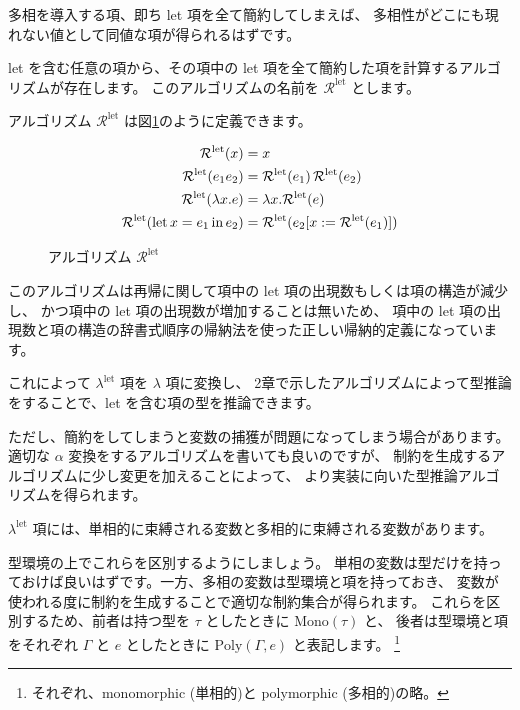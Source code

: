多相を導入する項、即ち let 項を全て簡約してしまえば、
多相性がどこにも現れない値として同値な項が得られるはずです。

let を含む任意の項から、その項中の let 項を全て簡約した項を計算するアルゴリズムが存在します。
このアルゴリズムの名前を $\mathcal R^\mathrm{let}$ とします。

アルゴリズム $\mathcal R^\mathrm{let}$ は図\ref{fig:algorithm-rlet}のように定義できます。

\begin{figure}[htbp]
  \begin{align*}
    \mathcal R^\mathrm{let}(x) &= x \\
    \mathcal R^\mathrm{let}(e_1 e_2) &=
      \mathcal R^\mathrm{let}(e_1) \, \mathcal R^\mathrm{let}(e_2) \\
    \mathcal R^\mathrm{let}(\lambda x . e) &=
      \lambda x . \mathcal R^\mathrm{let}(e) \\
    \mathcal R^\mathrm{let}(\mathrm{let} \, x = e_1 \, \mathrm{in} \, e_2) &=
      \mathcal R^\mathrm{let}(e_2 [x := \mathcal R^\mathrm{let}(e_1)])
  \end{align*}
  \caption{アルゴリズム $\mathcal R^\mathrm{let}$}
  \label{fig:algorithm-rlet}
\end{figure}

このアルゴリズムは再帰に関して項中の let 項の出現数もしくは項の構造が減少し、
かつ項中の let 項の出現数が増加することは無いため、
項中の let 項の出現数と項の構造の辞書式順序の帰納法を使った正しい帰納的定義になっています。

これによって $\lambda^\mathrm{let}$ 項を $\lambda$ 項に変換し、
2章で示したアルゴリズムによって型推論をすることで、let を含む項の型を推論できます。

ただし、簡約をしてしまうと変数の捕獲が問題になってしまう場合があります。
適切な $\alpha$ 変換をするアルゴリズムを書いても良いのですが、
制約を生成するアルゴリズムに少し変更を加えることによって、
より実装に向いた型推論アルゴリズムを得られます。

$\lambda^\mathrm{let}$ 項には、単相的に束縛される変数と多相的に束縛される変数があります。

型環境の上でこれらを区別するようにしましょう。
単相の変数は型だけを持っておけば良いはずです。一方、多相の変数は型環境と項を持っておき、
変数が使われる度に制約を生成することで適切な制約集合が得られます。
これらを区別するため、前者は持つ型を $\tau$ としたときに $\mathrm{Mono}(\tau)$ と、
後者は型環境と項をそれぞれ $\Gamma$ と $e$ としたときに $\mathrm{Poly}(\Gamma, e)$ と表記します。
\footnote{それぞれ、monomorphic (単相的)と polymorphic (多相的)の略。}

